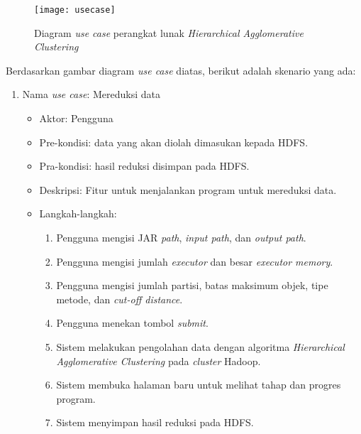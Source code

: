 \begin{figure}[H]
    \centering  
    \texttt{[image: usecase]}  
    \caption[Diagram \textit{use case} perangkat lunak \textit{Hierarchical Agglomerative Clustering}]{Diagram \textit{use case} perangkat lunak \textit{Hierarchical Agglomerative Clustering}} 
    \label{fig:usecase} 
\end{figure}

Berdasarkan gambar diagram \textit{use case} diatas, berikut adalah skenario yang ada:

\begin{enumerate}

\item Nama \textit{use case}: Mereduksi data

\begin{itemize}
\item Aktor: Pengguna

\item Pre-kondisi: data yang akan diolah dimasukan kepada HDFS.

\item Pra-kondisi: hasil reduksi disimpan pada HDFS.

\item Deskripsi: Fitur untuk menjalankan program untuk mereduksi data.

\item Langkah-langkah:

\begin{enumerate}

\item Pengguna mengisi JAR \textit{path}, \textit{input path}, dan \textit{output path}.

\item Pengguna mengisi jumlah \textit{executor} dan besar \textit{executor memory}.

\item Pengguna mengisi jumlah partisi, batas maksimum objek, tipe metode, dan \textit{cut-off distance}. 

\item Pengguna menekan tombol \textit{submit}.

\item Sistem melakukan pengolahan data dengan algoritma \textit{Hierarchical Agglomerative Clustering} pada \textit{cluster} Hadoop.

\item Sistem membuka halaman baru untuk melihat tahap dan progres program.

\item Sistem menyimpan hasil reduksi pada HDFS.
\end{enumerate}


\end{itemize}
\end{enumerate}
